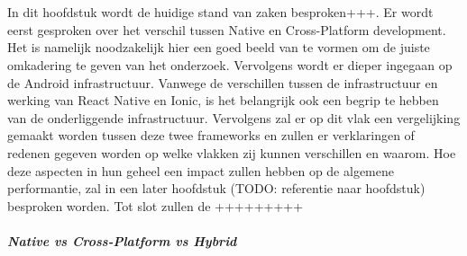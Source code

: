 \chapter{}%
\label{ch:stand-van-zaken}



In dit hoofdstuk wordt de huidige stand van zaken besproken+++. Er wordt eerst gesproken over het verschil tussen Native en Cross-Platform development. Het is namelijk noodzakelijk hier een goed beeld van te vormen om de juiste omkadering te geven van het onderzoek. Vervolgens wordt er dieper ingegaan op de Android infrastructuur. Vanwege de verschillen tussen de infrastructuur en werking van React Native en Ionic, is het belangrijk ook een begrip te hebben van de onderliggende infrastructuur. Vervolgens zal er op dit vlak een vergelijking gemaakt worden tussen deze twee frameworks en zullen er verklaringen of redenen gegeven worden op welke vlakken zij kunnen verschillen en waarom. Hoe deze aspecten in hun geheel een impact zullen hebben op de algemene performantie, zal in een later hoofdstuk (TODO: referentie naar hoofdstuk) besproken worden. Tot slot zullen de +++++++++

\paragraph{Native vs Cross-Platform vs Hybrid}

